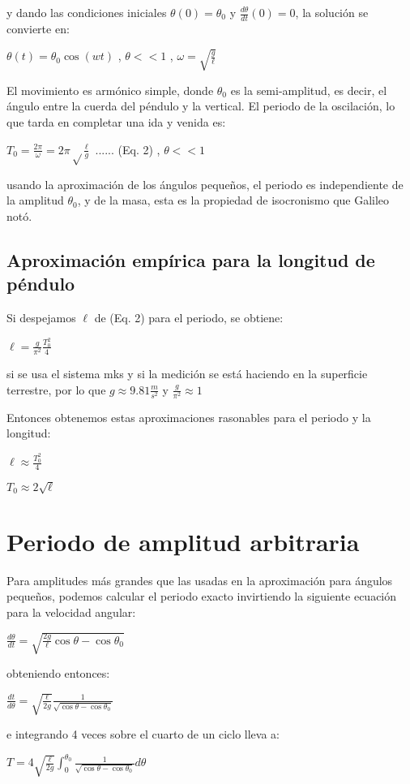 \documentclass[12pt]{article}
\begin{document}
\noindent y dando las condiciones iniciales $\theta(0)=\theta_0$ y $\frac{d\theta}{dt}(0)=0$, la solución se convierte en:

$\theta(t)=\theta_0\cos(wt)$ , $\theta<<1$ , $\omega=\sqrt{\frac{g}{\ell}}$

El movimiento es armónico simple, donde $\theta_0$ es la semi-amplitud, es decir, el ángulo entre la cuerda del péndulo y la vertical. 
El periodo de la oscilación, lo que tarda en completar una ida y venida es:

$T_0=\frac{2\pi}{\omega}=2\pi\sqrt\frac{\ell}{g}$ ...... (Eq. 2)  , $\theta<<1$

\noindent usando la aproximación de los ángulos pequeños, el periodo es independiente de la amplitud $\theta_0$, y de la masa, esta es la propiedad de isocronismo que Galileo notó.

\subsection{Aproximación empírica para la longitud de péndulo}
Si despejamos $\ell$ de (Eq. 2) para el periodo, se obtiene:

$\ell=\frac{g}{\pi^2}\frac{T_0^2}{4}$

\noindent si se usa el sistema mks y si la medición se está haciendo en la superficie terrestre, por lo que $g\approx9.81\frac{m}{s^2}$ y $\frac{g}{\pi^2}\approx1$

Entonces obtenemos estas aproximaciones rasonables para el periodo y la longitud:

$\ell\approx\frac{T_0^2}{4}$

$T_0\approx2\sqrt{\ell}$

\section{Periodo de amplitud arbitraria}
Para amplitudes más grandes que las usadas en la aproximación para ángulos pequeños, podemos calcular el periodo exacto invirtiendo la siguiente ecuación para la velocidad angular:

$\frac{d\theta}{dt}=\sqrt{\frac{2g}{\ell}\cos\theta-\cos\theta_0}$

\noindent obteniendo entonces:

$\frac{dt}{d\theta}=\sqrt{\frac{\ell}{2g}}\frac{1}{\sqrt{\cos\theta-\cos\theta_0}}$

\noindent 
e integrando 4 veces sobre el cuarto de un ciclo lleva a:

$T=4\sqrt{\frac{\ell}{2g}}\int_{0}^{\theta_0}\frac{1}{\sqrt{\cos\theta-\cos\theta_0}}d\theta$
\end{document}
